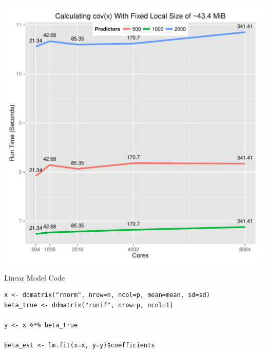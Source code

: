 \begin{frame}
  \begin{block}{}
  \begin{center}
    \includegraphics[height=.88\textheight]{../common/pics/cov}
  \end{center}
  \end{block}
\end{frame}




\begin{frame}[fragile]
  \begin{block}{Linear Model Code}
\begin{lstlisting}
x <- ddmatrix("rnorm", nrow=n, ncol=p, mean=mean, sd=sd)
beta_true <- ddmatrix("runif", nrow=p, ncol=1)

y <- x %*% beta_true

beta_est <- lm.fit(x=x, y=y)$coefficients 
\end{lstlisting}
  \end{block}
\end{frame}

